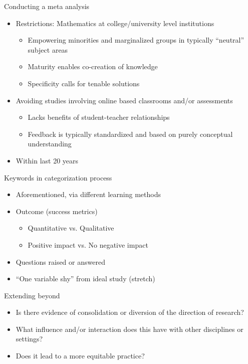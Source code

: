 \documentclass{beamer}
\begin{document}
\begin{frame}{Conducting a meta analysis}\pause
  \begin{itemize}
    \item Restrictions: Mathematics at college/university level institutions
    \begin{itemize}
      \item Empowering minorities and marginalized groups in typically ``neutral'' subject areas
      \item Maturity enables co-creation of knowledge
      \item Specificity calls for tenable solutions
    \end{itemize}\pause
    \item Avoiding studies involving online based classrooms and/or assessments
    \begin{itemize}
      \item Lacks benefits of student-teacher relationships
      \item Feedback is typically standardized and based on purely conceptual understanding
    \end{itemize}\pause
    \item Within last 20 years
  \end{itemize}
\end{frame}
\begin{frame}{Keywords in categorization process}\pause
  \begin{itemize}
    \item Aforementioned, via different learning methods\pause
    \item Outcome (success metrics)
      \begin{itemize}
        \item Quantitative vs. Qualitative
        \item Positive impact vs. No negative impact
      \end{itemize}\pause
    \item Questions raised or answered\pause
    \item ``One variable shy'' from ideal study (stretch)
  \end{itemize}
\end{frame}
\begin{frame}{Extending beyond}\pause
  \begin{itemize}
    \item Is there evidence of consolidation or diversion of the  direction of research?\pause
    \item What influence and/or interaction does this have with other disciplines or settings?\pause
    \item Does it lead to a more equitable practice?
  \end{itemize}
\end{frame}
\end{document}

